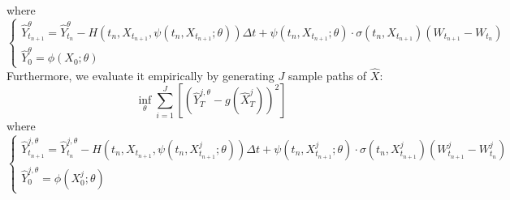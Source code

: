 \documentclass[11pt]{book}
\begin{document}
where
\begin{equation}
    \begin{cases}
        \hat{Y}^{\theta}_{t_{n+1}} = \hat{Y}^{\theta}_{t_{n}} -H(t_n,{X}_{t_{n+1}},\psi(t_n,{X}_{t_{n+1}};\theta))\Delta t + \psi(t_n,{X}_{t_{n+1}};\theta)\cdot\sigma(t_n,{X}_{t_{n+1}})(W_{t_{n+1}}-W_{t_{n}})\\
        \hat{Y}^{\theta}_0= \phi(X_0;\theta)
    \end{cases}
\end{equation}
Furthermore, we evaluate it empirically by generating $J$ sample paths of $\hat{X}$:
\[
\inf_{\theta}\sum_{i=1}^{J}\left[\left(\hat{Y}^{j,\theta}_T-g(\hat{X}^{j}_T)\right)^2\right]
\]
where
\begin{equation}
    \begin{cases}
        \hat{Y}^{j,\theta}_{t_{n+1}} = \hat{Y}^{j,\theta}_{t_{n}} -H(t_n,{X}_{t_{n+1}},\psi(t_n,{X}^{j}_{t_{n+1}};\theta))\Delta t + \psi(t_n,{X}^{j}_{t_{n+1}};\theta)\cdot\sigma(t_n,{X}^{j}_{t_{n+1}})(W^{j}_{t_{n+1}}-W^{j}_{t_{n}})\\
        \hat{Y}^{j,\theta}_0= \phi(X^{j}_0;\theta)
    \end{cases}
\end{equation}

\end{document}
